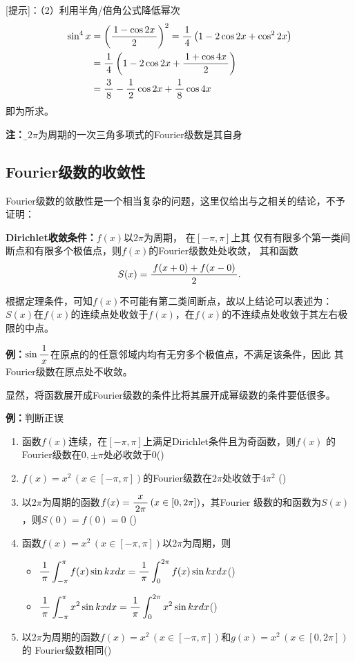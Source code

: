 [提示]：（2）利用半角/倍角公式降低幂次
\begin{align*}
	\sin^4x&=\left(\displaystyle\frac{\,{1-\cos2x}\,}{\,{2}\,}\right)^2
	=\displaystyle\frac{\,{1}\,}{\,{4}\,}\left(1-2\cos2x+\cos^22x\right)\\
	&=\displaystyle\frac{\,{1}\,}{\,{4}\,}\left(1-2\cos2x+\displaystyle\frac{\,{1+\cos4x}\,}{\,{2}\,}\right)\\
	&=\displaystyle\frac{\,{3}\,}{\,{8}\,}-\displaystyle\frac{\,{1}\,}{\,{2}\,}\cos2x+\displaystyle\frac{\,{1}\,}{\,{8}\,}\cos4x
\end{align*}
即为所求。

{\bf 注：}{\b 以$2\pi$为周期的一次三角多项式的Fourier级数是其自身}

\subsection{Fourier级数的收敛性}

Fourier级数的敛散性是一个相当复杂的问题，这里仅给出与之相关的结论，不予证明：

\begin{thx}
	{\bf Dirichlet收敛条件：}$f(x)$以$2\pi$为周期， 在$[-\pi,\pi]$上其
	仅有有限多个第一类间断点和有限多个极值点，则$f(x)$的Fourier级数处处收敛，
	 其和函数
	$$S(x) =\displaystyle\frac{\,{f(x+0)+f(x-0)}\,}{\,{2}\,}.$$
\end{thx}

根据定理条件，可知$f(x)$不可能有第二类间断点，故以上结论可以表述为：
$S(x)$在$f(x)$的连续点处收敛于$f(x)$，在$f(x)$的不连续点处收敛于其左右极限的中点。

{\bf 例：}$\sin\displaystyle\frac{\,{1}\,}{\,{x}\,}$在原点的的任意邻域内均有无穷多个极值点，不满足该条件，因此
其Fourier级数在原点处不收敛。

显然，将函数展开成Fourier级数的条件比将其展开成幂级数的条件要低很多。

{\bf 例：}判断正误
\begin{enumerate}[(1)]
  \setlength{\itemindent}{1cm}
  \item 函数$f(x)$连续，在$[-\pi,\pi]$上满足Dirichlet条件且为奇函数，则$f(x)$
  的Fourier级数在$0,\pm\pi$处必收敛于$0$\quad  (\;{$\surd$}\;) 
  \item $f(x)=x^2\,(x\in[-\pi,\pi])$的Fourier级数在$2\pi$处收敛于$4\pi^2$
    \quad(\;{$\times$}\;) 
  \item 以$2\pi$为周期的函数$f(x)=\displaystyle\frac{\,{x}\,}{\,{2\pi}\,}\,(x\in[0,2\pi])$，其Fourier
  级数的和函数为$S(x)$，则$S(0)=f(0)=0$ 
  \quad (\;{$\times$}\;)
  \item 函数$f(x)=x^2\,(x\in[-\pi,\pi])$以$2\pi$为周期，则 
  \begin{itemize}
    \item $\displaystyle\frac{\,{1}\,}{\,{\pi}\,}\displaystyle\int_{-\pi}^{\pi}f(x)\sin kxdx=\displaystyle\frac{\,{1}\,}{\,{\pi}\,}\displaystyle\int_{0}^{2\pi}f(x)\sin kxdx$\quad (\;{$\surd$}\;) 
    \item $\displaystyle\frac{\,{1}\,}{\,{\pi}\,}\displaystyle\int_{-\pi}^{\pi}x^2\sin kxdx=\displaystyle\frac{\,{1}\,}{\,{\pi}\,}\displaystyle\int_{0}^{2\pi}x^2\sin kxdx$\quad (\;{$\times$}\;) 
  \end{itemize}
  \item 以$2\pi$为周期的函数$f(x)=x^2\,(x\in[-\pi,\pi])$和$g(x)=x^2\,(x\in[0,2\pi])$的
  Fourier级数相同\quad (\;{$\times$}\;)
\end{enumerate}


